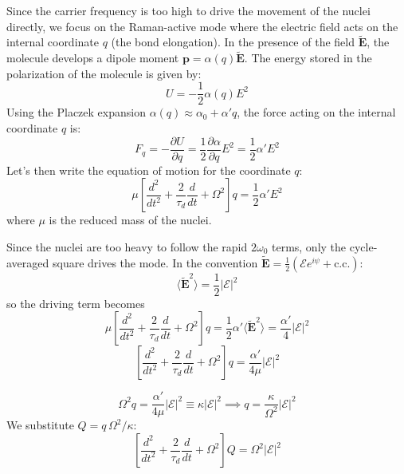 \documentclass[11pt,a4paper]{article}
\begin{document}
Since the carrier frequency is too high to drive the movement of the nuclei directly, we focus on the Raman-active mode where the electric field acts on the internal coordinate $q$ (the bond elongation). In the presence of the field $\tilde{\mathbf{E}}$, the molecule develops a dipole moment $\mathbf{p} = \alpha(q)\tilde{\mathbf{E}}$. The energy stored in the polarization of the molecule is given by:
\begin{equation*}
U = -\frac{1}{2}\alpha(q) E^2
\end{equation*}
Using the Placzek expansion $\alpha(q) \approx \alpha_0 + \alpha' q$, the force acting on the internal coordinate $q$ is:
\begin{equation*}
F_q = -\frac{\partial U}{\partial q} = \frac{1}{2} \frac{\partial \alpha}{\partial q} E^2 = \frac{1}{2} \alpha' E^2
\end{equation*}
Let's then write the equation of motion for the coordinate $q$:
\begin{equation*}
\mu \left[ \frac{d^2}{dt^2} + \frac{2}{\tau_d}\frac{d}{dt} + \Omega^2 \right] q = \frac{1}{2} \alpha' E^2
\end{equation*}
where $\mu$ is the reduced mass of the nuclei.


Since the nuclei are too heavy to follow the rapid $2\omega_0$ terms, only the
cycle-averaged square drives the mode. In the convention
$\tilde{\mathbf{E}}=\tfrac12(\mathcal{E}e^{i\psi}+\text{c.c.})$:
\begin{equation*}
\langle\tilde{\mathbf{E}}^2\rangle = \frac{1}{2}|\mathcal{E}|^2
\end{equation*}
so the driving term becomes
\begin{equation*}
\mu\left[\frac{d^2}{dt^2}+\frac{2}{\tau_d}\frac{d}{dt}+\Omega^2\right]q
= \frac{1}{2}\alpha'\langle\tilde{\mathbf{E}}^2\rangle
= \frac{\alpha'}{4}|\mathcal{E}|^2
\end{equation*}
\begin{equation*}
\left[ \frac{d^2}{dt^2} + \frac{2}{\tau_d}\frac{d}{dt} + \Omega^2 \right] q = \frac{\alpha'}{4\mu}|\mathcal{E}|^2
\end{equation*}

\begin{equation*}
\Omega^2 q = \frac{\alpha'}{4\mu}|\mathcal{E}|^2 \equiv \kappa|\mathcal{E}|^2
\implies q = \frac{\kappa}{\Omega^2}|\mathcal{E}|^2
\end{equation*}
We substitute $Q = q\,\Omega^2/\kappa$:
\begin{equation*}
\left[\frac{d^2}{dt^2}+\frac{2}{\tau_d}\frac{d}{dt}+\Omega^2\right]Q = \Omega^2|\mathcal{E}|^2
\end{equation*}
\end{document}

